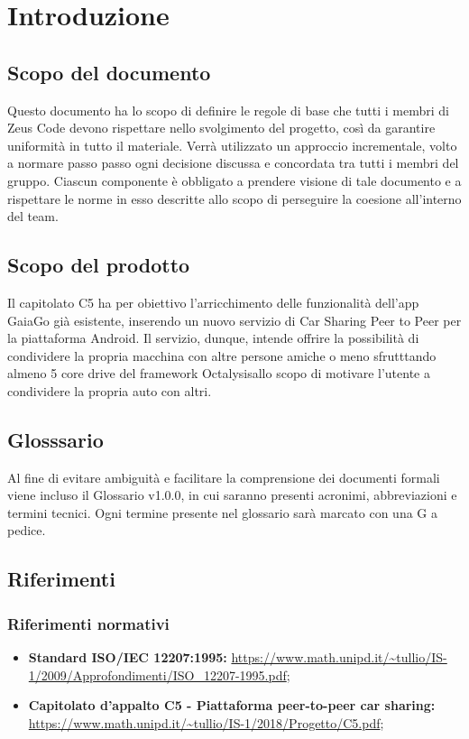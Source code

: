 \section {Introduzione}
\subsection {Scopo del documento}
Questo documento  ha lo scopo di definire le regole di base che tutti i membri di Zeus Code devono rispettare nello svolgimento del progetto, così da garantire uniformità in tutto il materiale. Verrà utilizzato un approccio incrementale, volto a normare passo passo ogni decisione discussa e concordata tra tutti i membri del gruppo. Ciascun componente è obbligato a prendere visione di tale documento e a rispettare le norme in esso descritte allo scopo di perseguire la coesione all'interno del team.
\subsection {Scopo del prodotto}
Il capitolato C5 ha per obiettivo l'arricchimento delle funzionalità dell'app GaiaGo già esistente, inserendo un nuovo servizio di Car Sharing Peer to Peer per la piattaforma Android.
Il servizio, dunque, intende offrire la possibilità di condividere la propria macchina con altre persone amiche o meno sfrutttando almeno 5 core drive del framework Octalysis\glosp allo scopo di motivare l'utente a condividere la propria auto con altri.
\subsection {Glosssario}
Al fine di evitare ambiguità e facilitare la comprensione dei documenti formali viene incluso il Glossario v1.0.0, in cui saranno presenti acronimi, abbreviazioni e termini tecnici. Ogni termine presente nel glossario sarà marcato con una G a pedice.
\subsection {Riferimenti}
\subsubsection {Riferimenti normativi}

\begin{itemize}
	\item  \textbf{Standard ISO/IEC 12207:1995:}\newline
	\url{https://www.math.unipd.it/~tullio/IS-1/2009/Approfondimenti/ISO_12207-1995.pdf};
	\item \textbf{Capitolato d'appalto C5 - Piattaforma peer-to-peer car sharing:}\newline 
	\url{https://www.math.unipd.it/~tullio/IS-1/2018/Progetto/C5.pdf};
\end{itemize}

